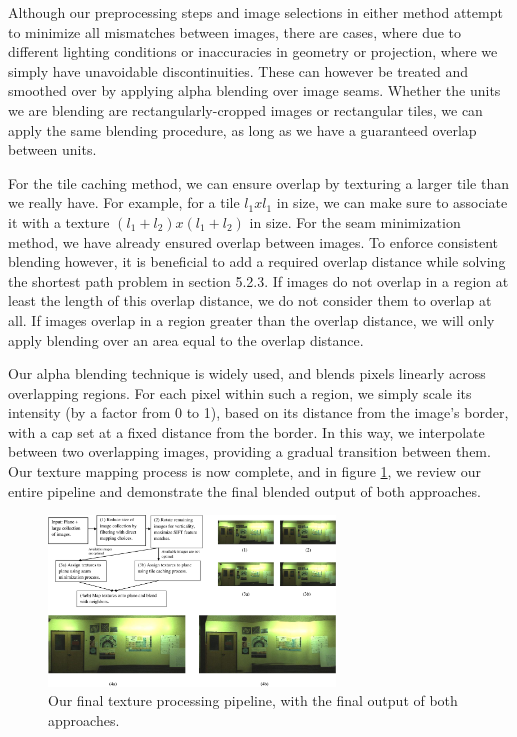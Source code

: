 \documentclass[10pt,twocolumn,letterpaper]{article}
\begin{document}
Although our preprocessing steps and image selections in either method
attempt to minimize all mismatches between images, there are cases,
where due to different lighting conditions or inaccuracies in geometry
or projection, where we simply have unavoidable discontinuities. These
can however be treated and smoothed over by applying alpha blending
over image seams.  Whether the units we are blending are
rectangularly-cropped images or rectangular tiles, we can apply the
same blending procedure, as long as we have a guaranteed overlap
between units.

For the tile caching method, we can ensure overlap by texturing a
larger tile than we really have. For example, for a tile $l_1 x l_1$
in size, we can make sure to associate it with a texture $(l_1 + l_2)
x (l_1 + l_2)$ in size. For the seam minimization method, we have
already ensured overlap between images. To enforce consistent blending
however, it is beneficial to add a required overlap distance while
solving the shortest path problem in section 5.2.3. If images do not
overlap in a region at least the length of this overlap distance, we
do not consider them to overlap at all. If images overlap in a region
greater than the overlap distance, we will only apply blending over an
area equal to the overlap distance.

Our alpha blending technique is widely used, and blends pixels
linearly across overlapping regions. For each pixel within such a
region, we simply scale its intensity (by a factor from 0 to 1), based
on its distance from the image's border, with a cap set at a fixed
distance from the border. In this way, we interpolate between two
overlapping images, providing a gradual transition between them. Our
texture mapping process is now complete, and in figure
\ref{fig:pipeline}, we review our entire pipeline and demonstrate the
final blended output of both approaches.

\begin{figure}
  \centering
  \includegraphics[width=3in]{pipeline.pdf}
  \caption{Our final texture processing pipeline, with the final
    output of both approaches.}
  \label{fig:pipeline}
\end{figure}
\end{document}
